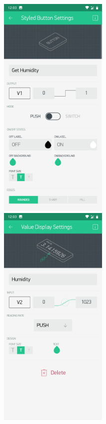 \documentclass[12pt,a4paper]{article}
\begin{document}
\begin{figure}[h!]
\centerline{%
\includegraphics[width=9cm,height=11cm]{Lab7_3.jpg}%
\hspace{0.5 cm}
\includegraphics[width=9cm,height=11cm]{Lab7_4.jpg}%
}
\end{figure}
\end{document}
